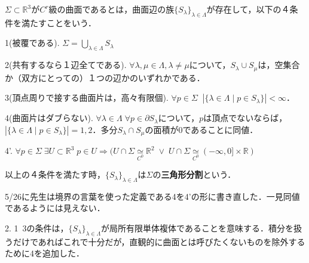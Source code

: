 \documentclass[uplatex, dvipdfmx]{jsreport}
\begin{document}
\begin{definition}[曲面の定義]
    $\Sigma\subset\mathbb{R}^3$が$C^r$級の曲面であるとは，曲面辺の族$\{S_\lambda\}_{\lambda\in\Lambda}$が存在して，以下の４条件を満たすことをいう．

    1(被覆である). $\Sigma=\bigcup_{\lambda\in\Lambda}S_\lambda$

    2(共有するなら１辺全てである). $\forall\lambda,\mu\in\Lambda, \lambda\ne\mu$について，$S_\lambda\cup S_\mu$は，空集合か（双方にとっての）１つの辺かのいずれかである．

    3(頂点周りで接する曲面片は，高々有限個). $\forall p\in\Sigma\;\; |\{ \lambda\in\Lambda\mid p\in S_\lambda \}|<\infty$．

    4(曲面片はダブらない). $\forall\lambda\in\Lambda\;\forall p\in\partial S_\lambda$について，$p$は頂点でないならば，$|\{ \lambda\in\Lambda\mid p\in S_\lambda \}|=1,2$．多分$S_\lambda\cap S_\mu$の面積が$0$であることに同値．

    4'. $\forall p\in\Sigma\; \exists U\subset\mathbb{R}^3\; p\in U\Rightarrow (U\cap\Sigma\underset{C^0}{\simeq}\mathbb{R}^2\;\lor\; U\cap\Sigma\underset{C^0}{\simeq}(-\infty,0]\times\mathbb{R})$

    以上の４条件を満たす時，$\{S_\lambda\}_{\lambda\in\Lambda}$は$\Sigma$の\textbf{三角形分割}という．
\end{definition}
\begin{remark}
    5/26に先生は境界の言葉を使った定義である4を4'の形に書き直した．一見同値であるようには見えない．

    2. 1~3の条件は，$\{S_\lambda\}_{\lambda\in\Lambda}$が局所有限単体複体であることを意味する．積分を扱うだけであればこれで十分だが，直観的に曲面とは呼びたくないものを除外するために4を追加した．
\end{remark}
\end{document}
